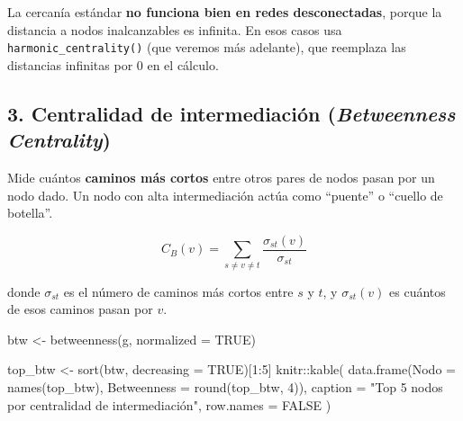 \documentclass[
  letterpaper,
  DIV=11,
  numbers=noendperiod]{scrreprt}
\newenvironment{Shaded}{\begin{snugshade}}{\end{snugshade}}
\newcommand{\AttributeTok}[1]{\textcolor[rgb]{0.40,0.45,0.13}{#1}}
\newcommand{\ConstantTok}[1]{\textcolor[rgb]{0.56,0.35,0.01}{#1}}
\newcommand{\DecValTok}[1]{\textcolor[rgb]{0.68,0.00,0.00}{#1}}
\newcommand{\FunctionTok}[1]{\textcolor[rgb]{0.28,0.35,0.67}{#1}}
\newcommand{\NormalTok}[1]{\textcolor[rgb]{0.00,0.23,0.31}{#1}}
\newcommand{\OtherTok}[1]{\textcolor[rgb]{0.00,0.23,0.31}{#1}}
\newcommand{\SpecialCharTok}[1]{\textcolor[rgb]{0.37,0.37,0.37}{#1}}
\newcommand{\StringTok}[1]{\textcolor[rgb]{0.13,0.47,0.30}{#1}}
\begin{document}
\begin{tcolorbox}[enhanced jigsaw, toprule=.15mm, colframe=quarto-callout-warning-color-frame, coltitle=black, titlerule=0mm, colback=white, breakable, leftrule=.75mm, arc=.35mm, bottomtitle=1mm, toptitle=1mm, rightrule=.15mm, bottomrule=.15mm, left=2mm, title=\textcolor{quarto-callout-warning-color}{\faExclamationTriangle}\hspace{0.5em}{⚠️ Error frecuente}, colbacktitle=quarto-callout-warning-color!10!white, opacityback=0, opacitybacktitle=0.6]

La cercanía estándar \textbf{no funciona bien en redes desconectadas},
porque la distancia a nodos inalcanzables es infinita. En esos casos usa
\texttt{harmonic\_centrality()} (que veremos más adelante), que
reemplaza las distancias infinitas por 0 en el cálculo.

\end{tcolorbox}

\subsection{\texorpdfstring{3. Centralidad de intermediación
(\emph{Betweenness
Centrality})}{3. Centralidad de intermediación (Betweenness Centrality)}}\label{centralidad-de-intermediaciuxf3n-betweenness-centrality}

Mide cuántos \textbf{caminos más cortos} entre otros pares de nodos
pasan por un nodo dado. Un nodo con alta intermediación actúa como
``puente'' o ``cuello de botella''.

\[
C_B(v) = \sum_{s \neq v \neq t} \frac{\sigma_{st}(v)}{\sigma_{st}}
\]

donde \(\sigma_{st}\) es el número de caminos más cortos entre \(s\) y
\(t\), y \(\sigma_{st}(v)\) es cuántos de esos caminos pasan por \(v\).

\begin{Shaded}
\begin{Highlighting}[]
\NormalTok{btw }\OtherTok{\textless{}{-}} \FunctionTok{betweenness}\NormalTok{(g, }\AttributeTok{normalized =} \ConstantTok{TRUE}\NormalTok{)}

\NormalTok{top\_btw }\OtherTok{\textless{}{-}} \FunctionTok{sort}\NormalTok{(btw, }\AttributeTok{decreasing =} \ConstantTok{TRUE}\NormalTok{)[}\DecValTok{1}\SpecialCharTok{:}\DecValTok{5}\NormalTok{]}
\NormalTok{knitr}\SpecialCharTok{::}\FunctionTok{kable}\NormalTok{(}
  \FunctionTok{data.frame}\NormalTok{(}\AttributeTok{Nodo =} \FunctionTok{names}\NormalTok{(top\_btw), }\AttributeTok{Betweenness =} \FunctionTok{round}\NormalTok{(top\_btw, }\DecValTok{4}\NormalTok{)),}
  \AttributeTok{caption =} \StringTok{"Top 5 nodos por centralidad de intermediación"}\NormalTok{,}
  \AttributeTok{row.names =} \ConstantTok{FALSE}
\NormalTok{)}
\end{Highlighting}
\end{Shaded}
\end{document}
